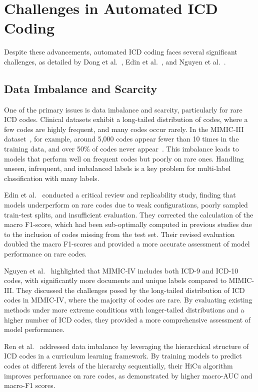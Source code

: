 \documentclass[12pt,a4paper]{report}
\begin{document}
\section{Challenges in Automated ICD Coding}

Despite these advancements, automated ICD coding faces several significant challenges, as detailed by Dong et al.~\cite{dong2022automated}, Edin et al.~\cite{edin2023automated}, and Nguyen et al.~\cite{nguyen2023mimicivicd}.

\subsection{Data Imbalance and Scarcity}

One of the primary issues is data imbalance and scarcity, particularly for rare ICD codes. Clinical datasets exhibit a long-tailed distribution of codes, where a few codes are highly frequent, and many codes occur rarely. In the MIMIC-III dataset~\cite{johnson2016mimic}, for example, around 5,000 codes appear fewer than 10 times in the training data, and over 50\% of codes never appear~\cite{rios2018few}. This imbalance leads to models that perform well on frequent codes but poorly on rare ones. Handling unseen, infrequent, and imbalanced labels is a key problem for multi-label classification with many labels.

Edin et al.~\cite{edin2023automated} conducted a critical review and replicability study, finding that models underperform on rare codes due to weak configurations, poorly sampled train-test splits, and insufficient evaluation. They corrected the calculation of the macro F1-score, which had been sub-optimally computed in previous studies due to the inclusion of codes missing from the test set. Their revised evaluation doubled the macro F1-scores and provided a more accurate assessment of model performance on rare codes.

Nguyen et al.~\cite{nguyen2023mimicivicd} highlighted that MIMIC-IV includes both ICD-9 and ICD-10 codes, with significantly more documents and unique labels compared to MIMIC-III. They discussed the challenges posed by the long-tailed distribution of ICD codes in MIMIC-IV, where the majority of codes are rare. By evaluating existing methods under more extreme conditions with longer-tailed distributions and a higher number of ICD codes, they provided a more comprehensive assessment of model performance.

Ren et al.~\cite{ren2022hicu} addressed data imbalance by leveraging the hierarchical structure of ICD codes in a curriculum learning framework. By training models to predict codes at different levels of the hierarchy sequentially, their HiCu algorithm improves performance on rare codes, as demonstrated by higher macro-AUC and macro-F1 scores.
\end{document}
